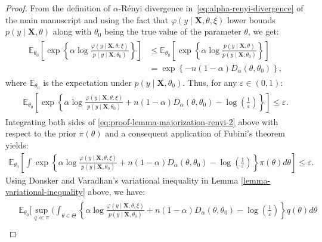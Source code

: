 \documentclass[12pt]{article}
\numberwithin{equation}{section}
\begin{document}
\begin{proof}
From the definition of $\alpha$-R\'{e}nyi divergence in~\eqref{eq:alpha-renyi-divergence} of the main manuscript and using the fact that $\varphi(y\mid \mathbf{X}, \theta, \xi)$ lower bounds $p(y\mid \mathbf{X}, \theta)$ along with $\theta_0$ being the true value of the parameter $\theta$, we get:
\begin{align}\label{eq:proof-lemma-majorization-renyi-1}
    \begin{split}
        \mathbb{E}_{\theta_0}\left[\exp\left\{\alpha\log\frac{\varphi(y\mid \mathbf{X},\theta, \xi)}{p(y\mid \mathbf{X}, \theta_0)}\right\}\right] &\leq \mathbb{E}_{\theta_0}\left[\exp\left\{\alpha\log\frac{p(y\mid \mathbf{X}, \theta)}{p(y\mid \mathbf{X}, \theta_0)}\right\}\right]\\
        &= \exp\left\{-n(1-\alpha)D_{\alpha}(\theta, \theta_0)\right\},
    \end{split}
\end{align}
where $\mathbb{E}_{\theta_0}$ is the expectation under $p(y\mid \mathbf{X}, \theta_0)$. Thus, for any $\varepsilon\in (0,1)$:
\begin{align}\label{eq:proof-lemma-majorization-renyi-2}
    \begin{split}
        \mathbb{E}_{\theta_0}\left[\exp\left\{\alpha\log\frac{\varphi(y\mid \mathbf{X}, \theta, \xi)}{p(y\mid \mathbf{X}, \theta_0)} + n(1-\alpha)D_{\alpha}(\theta, \theta_0) - \log\left(\frac{1}{\varepsilon}\right)\right\}\right] \leq \varepsilon.
    \end{split}
\end{align}
Integrating both sides of \eqref{eq:proof-lemma-majorization-renyi-2} above with respect to the prior $\pi(\theta)$ and a consequent application of Fubini's theorem yields:
\begin{align}\label{eq:proof-lemma-majorization-renyi-3}
    \mathbb{E}_{\theta_0}\left[\int \exp\left\{\alpha \log\frac{\varphi(y\mid \mathbf{X}, \theta, \xi)}{p(y\mid \mathbf{X}, \theta_0)} + n(1-\alpha)D_{\alpha}(\theta, \theta_0) - \log\left(\frac{1}{\varepsilon}\right)\right\}\pi(\theta)d\theta\right] \leq \varepsilon.
\end{align}
Using Donsker and Varadhan's variational inequality in Lemma \ref{lemma-variational-inequality} above, we have:
\begin{align}\label{eq:proof-lemma-majorization-renyi-4}
    \begin{split}
        &\mathbb{E}_{\theta_0}\Big[\sup_{q\ll \pi}\Big(\int_{\theta\in \Theta}\left\{\alpha\log\frac{\varphi(y\mid\mathbf{X}, \theta, \xi)}{p(y\mid \mathbf{X}, \theta_0)} + n(1-\alpha)D_{\alpha}(\theta, \theta_0) - \log\left(\frac{1}{\varepsilon}\right)\right\}q(\theta)d\theta\\

\end{split}
\end{align}
\end{proof}
\end{document}
